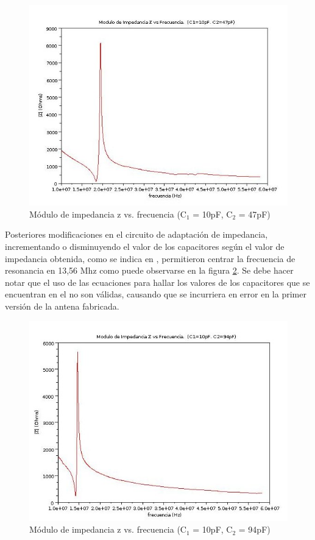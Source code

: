 \begin{figure}[H]
\centering
  \begin{center}
  \includegraphics[scale=.45]{Imagenes/match47_L.jpg}
  \end{center}
  \caption{Módulo de impedancia z vs. frecuencia (C$_{1}$ = 10pF, C$_{2}$ = 47pF)}\label{Fig:18M} 
\end{figure}

Posteriores modificaciones en el circuito de adaptación de impedancia, incrementando o disminuyendo el valor de los capacitores según el valor de impedancia obtenida, como se indica en \cite{MRICF},  permitieron centrar la frecuencia de resonancia en 13,56 Mhz como puede observarse en la figura \ref{Fig:1356M}. Se debe hacer notar que el uso de las ecuaciones para hallar los valores de los capacitores que se encuentran en el \cite{MRICF} no son válidas, causando que se incurriera en error en la primer versión de la antena fabricada.  

\begin{figure}[H]
\centering
  \begin{center}
  \includegraphics[scale=.45]{Imagenes/match94_L.jpg}
  \end{center}
  \caption{Módulo de impedancia z vs. frecuencia (C$_{1}$ = 10pF, C$_{2}$ = 94pF)}\label{Fig:1356M} 
\end{figure}

